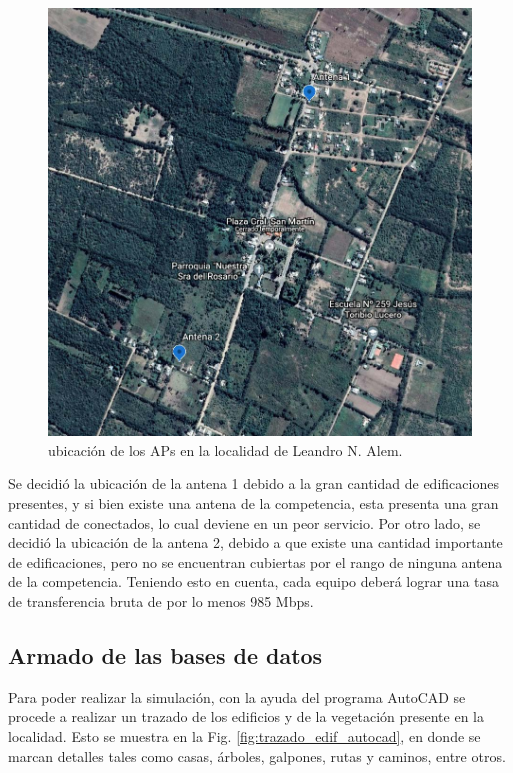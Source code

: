 \documentclass[11pt,a4paper]{article}
\begin{document}
\begin{figure}[htbp]
  \centering
  \includegraphics[width=0.8\linewidth]{fotos_ema/ubic_ap_alem.jpg}
  \caption{ubicación de los APs en la localidad de Leandro N. Alem.}
  \label{fig:ubic_ap_alem}
\end{figure}



Se decidió la ubicación de la antena 1 debido a la gran cantidad de edificaciones presentes, y si bien existe una antena de la competencia, esta presenta una gran cantidad de conectados, lo cual deviene en un peor servicio. 
Por otro lado, se decidió la ubicación de la antena 2, debido a que existe una cantidad importante de edificaciones, pero no se encuentran cubiertas por el rango de ninguna antena de la competencia. 
Teniendo esto en cuenta, cada equipo deberá lograr una tasa de transferencia bruta de por lo menos 985 Mbps.

\subsection{Armado de las bases de datos}

Para poder realizar la simulación, con la ayuda del programa AutoCAD se procede a realizar un trazado de los edificios y de la vegetación presente en la localidad. 
Esto se muestra en la Fig. \ref{fig:trazado_edif_autocad}, en donde se marcan detalles tales como casas, árboles, galpones, rutas y caminos, entre otros.
\end{document}
